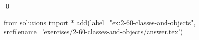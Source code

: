 
\begin{ex}
  \label{ex:2-60-classes-and-objects}
  
  \qed
\end{ex}
\begin{python0}
from solutions import *
add(label="ex:2-60-classes-and-objects",
    srcfilename='exercises/2-60-classes-and-objects/answer.tex')
\end{python0}
